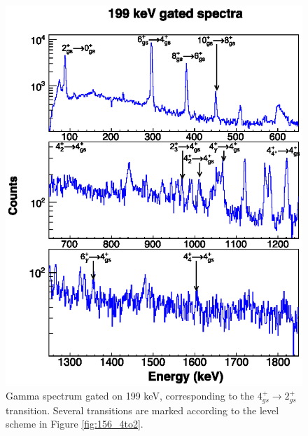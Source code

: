 \begin{figure}
    \includegraphics[scale=1.3]{156GdTablesAndFigs/199_gamma.eps}
    \caption{Gamma spectrum gated on 199 keV, corresponding to the $4^+_{gs}\rightarrow 2^+_{gs}$ transition. Several transitions are marked according to the level scheme in Figure \ref{fig:156_4to2}.}
    \label{fig:156_4to2spec}
\end{figure}